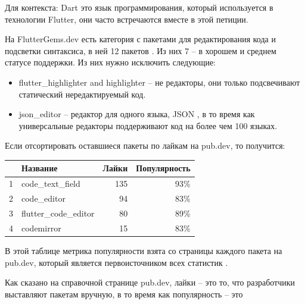 Для контекста: Dart это язык программирования, который используется в технологии Flutter,
они часто встречаются вместе в этой петиции.

На FlutterGems.dev есть категория с пакетами для редактирования кода и подсветки синтаксиса, в ней 12 пакетов
.
Из них 7 -- в хорошем и среднем статусе поддержки.
Из них нужно исключить следующие:

\vspace{-0.5\baselineskip}
\vspace{-0.5\baselineskip}
\begin{itemize}[nosep]

    \item flutter\_highlighter and highlighter -- не редакторы,
    они только подсвечивают статический нередактируемый код.

    \item json\_editor -- редактор для одного языка, JSON ,
    в то время как универсальные редакторы поддерживают код на более чем 100 языках.

\end{itemize}

Если отсортировать оставшиеся пакеты по лайкам на pub.dev, то получится:

\begin{center}
    \begin{tabular}{|l|l|r|r|}
        \hline
        & Название & Лайки & Популярность\\
        \hline
        1 & code\_text\_field & 135 & 93\%\\
        2 & code\_editor & 94 & 83\%\\
        3 & flutter\_code\_editor & 80 & 89\%\\
        4 & codemirror & 15 & 83\%\\
        \hline
    \end{tabular}
\end{center}

В этой таблице метрика популярности взята со страницы каждого пакета на pub.dev,
который является первоисточником всех статистик .

Как сказано на справочной странице pub.dev, лайки -- это то, что разработчики выставляют пакетам вручную,
в то время как популярность -- это


